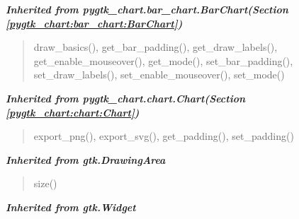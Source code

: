 \large{\textbf{\textit{Inherited from pygtk\_chart.bar\_chart.BarChart\textit{(Section \ref{pygtk_chart:bar_chart:BarChart})}}}}

\begin{quote}
draw\_basics(), get\_bar\_padding(), get\_draw\_labels(), get\_enable\_mouseover(), get\_mode(), set\_bar\_padding(), set\_draw\_labels(), set\_enable\_mouseover(), set\_mode()
\end{quote}

\large{\textbf{\textit{Inherited from pygtk\_chart.chart.Chart\textit{(Section \ref{pygtk_chart:chart:Chart})}}}}

\begin{quote}
export\_png(), export\_svg(), get\_padding(), set\_padding()
\end{quote}

\large{\textbf{\textit{Inherited from gtk.DrawingArea}}}

\begin{quote}
size()
\end{quote}

\large{\textbf{\textit{Inherited from gtk.Widget}}}

